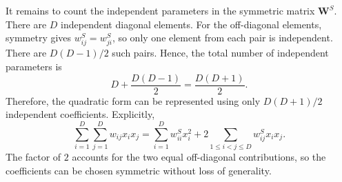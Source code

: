 \documentclass{article}
\begin{document}
\begin{tcolorbox}[breakable,colback=gray!5,colframe=gray!60,title=Solution]
It remains to count the independent parameters in the symmetric matrix
$\mathbf{W}^{S}$. There are $D$ independent diagonal elements. For the
off-diagonal elements, symmetry gives $w_{ij}^{S}=w_{ji}^{S}$, so only one
element from each pair is independent. There are
$D(D-1)/2$ such pairs. Hence, the total number of independent parameters is
\[
D+\frac{D(D-1)}{2}
=\frac{D(D+1)}{2}.
\]
Therefore, the quadratic form can be represented using only
$D(D+1)/2$ independent coefficients. Explicitly,
\[
\sum_{i=1}^{D}\sum_{j=1}^{D} w_{ij}x_i x_j
=\sum_{i=1}^{D} w_{ii}^{S}x_i^2
+2\sum_{1\leq i<j\leq D} w_{ij}^{S}x_i x_j.
\]
The factor of $2$ accounts for the two equal off-diagonal contributions,
so the coefficients can be chosen symmetric without loss of generality.
\end{tcolorbox}
\end{document}
